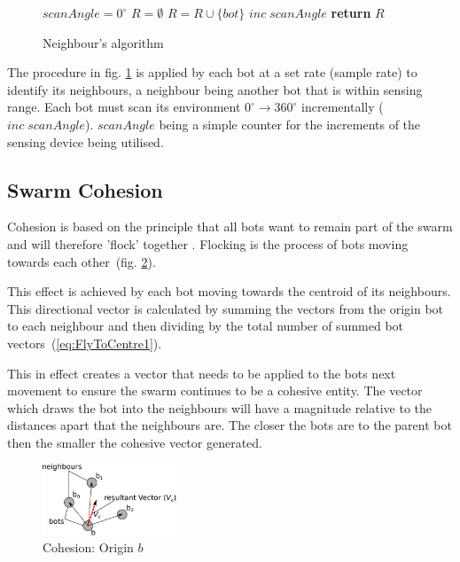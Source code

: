 \documentclass[10pt,journal,letterpaper,twoside]{IEEEtran}
\newcommand{\Fig}{fig.}
\begin{document}
\begin{figure}[H]
\begin{algorithmic}[1]
\State $scanAngle = 0^\circ$\;
\State $R = \emptyset$\;
\State $R = R \cup \{bot\}$\;
\State $inc\; scanAngle$
\EndWhile
\State \textbf{return} $R$
\EndProcedure
\end{algorithmic}
\caption{Neighbour's algorithm}\label{algo:neighbourDetect}
\end{figure}

The procedure in \Fig{} \ref{algo:neighbourDetect} is applied by each bot at a set rate (sample rate) to identify its neighbours, a neighbour being another bot that is within sensing range. Each bot must scan its environment $0^\circ \rightarrow 360^\circ$ incrementally ($inc\; scanAngle$). $scanAngle$ being a simple counter for the increments of the sensing device being utilised.

\subsection{Swarm Cohesion}
Cohesion is based on the principle that all bots want to remain part of the swarm and will therefore 'flock' together \cite{VGKP04}. Flocking is the process of bots moving towards each other~(\Fig{} \ref{methods:FlyToCentre1}).

This effect is achieved by each bot moving towards the centroid of its neighbours. This directional vector is calculated by summing the vectors from the origin bot to each neighbour and then dividing by the total number of summed bot vectors~(\ref{eq:FlyToCentre1}).

This in effect creates a vector that needs to be applied to the bots next movement to ensure the swarm continues to be a cohesive entity. The vector which draws the bot into the neighbours will have a magnitude relative to the distances apart that the neighbours are. The closer the bots are to the parent bot then the smaller the cohesive vector generated.

\begin{figure}[H]
\begin{center}
\includegraphics[width=4cm]{figures/FlyToCentre1}
\end{center}
\caption{Cohesion: Origin $b$ \label{methods:FlyToCentre1}}
\end{figure}
\end{document}
